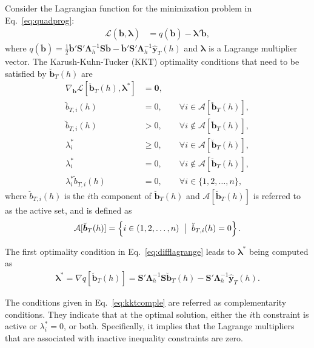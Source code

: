 \documentclass[11pt]{article}
\newcommand{\0}{\phantom{0}}
\begin{document}
Consider the Lagrangian function for the minimization problem in Eq.~\eqref{eq:quadprog}:
\begin{align*}
\mathcal{L}(\ddot{\bm{b}}, \bm{\lambda}) & = q(\ddot{\bm{b}}) - \bm{\lambda}'\ddot{\bm{b}},
\end{align*}
where $q(\ddot{\bm{b}}) = \frac{1}{2}\ddot{\bm{b}}'\bm{S}'\bm{\Lambda}^{-1}_{h}\bm{S}\ddot{\bm{b}} - \ddot{\bm{b}}'\bm{S}'\bm{\Lambda}^{-1}_{h}\hat{\bm{y}}_{T}(h)$ and $\bm{\lambda}$ is a Lagrange multiplier vector. The Karush-Kuhn-Tucker (KKT) optimality conditions that need to be satisfied by $\breve{\bm{b}}_{T}(h)$ are
\begin{subequations}
	\label{eq:optcond}
	\begin{align}
	\label{eq:difflagrange}
	\nabla_{\bm{b}} \mathcal{L}[\breve{\bm{b}}_{T}(h), \bm{\lambda}^{*}] & = \bm{0},\\
	\breve{b}_{T, i}(h) & = 0, \qquad \forall i \in \mathcal{A}[\breve{\bm{b}}_{T}(h)],\\
	\breve{b}_{T, i}(h) & > 0, \qquad \forall i \notin \mathcal{A}[\breve{\bm{b}}_{T}(h)],\\
	\lambda^{*}_{i} & \geq 0, \qquad \forall i \in \mathcal{A}[\breve{\bm{b}}_{T}(h)],\\
	\lambda^{*}_{i} & = 0, \qquad \forall i \notin \mathcal{A}[\breve{\bm{b}}_{T}(h)],\\
	\lambda_{i}^{*} \breve{b}_{T, i}(h) & = 0, \qquad \forall i \in \{1, 2, \dots, n\}, \label{eq:kktcomple}
	\end{align}
\end{subequations}
where $\breve{b}_{T, i}(h)$ is the $i$th component of $\breve{\bm{b}}_{T}(h)$ and $\mathcal{A}[\breve{\bm{b}}_{T}(h)]$ is referred to as the active set, and is defined as
\begin{align*}
\mathcal{A}[\breve{\bm{b}}_{T}(h)] = \left\{i \in (1, 2, \dots, n) \hspace*{2mm} \big|\hspace*{2mm} \breve{b}_{T, i}(h) = 0\right\}.
\end{align*}

The first optimality condition in Eq.~\eqref{eq:difflagrange} leads to $\bm{\lambda}^{*}$ being computed as
\begin{align*}
\bm{\lambda}^{*} = \nabla q[\breve{\bm{b}}_{T}(h)] = \bm{S}'\bm{\Lambda}^{-1}_{h}\bm{S}\breve{\bm{b}}_{T}(h) - \bm{S}'\bm{\Lambda}^{-1}_{h}\hat{\bm{y}}_{T}(h).
\end{align*}

The conditions given in Eq.~\eqref{eq:kktcomple} are referred as complementarity conditions. They indicate that at the optimal solution, either the $i$th constraint is active or $\lambda_{i}^{*} = 0$, or both. Specifically, it implies that the Lagrange multipliers that are associated with inactive inequality constraints are zero.
\end{document}

